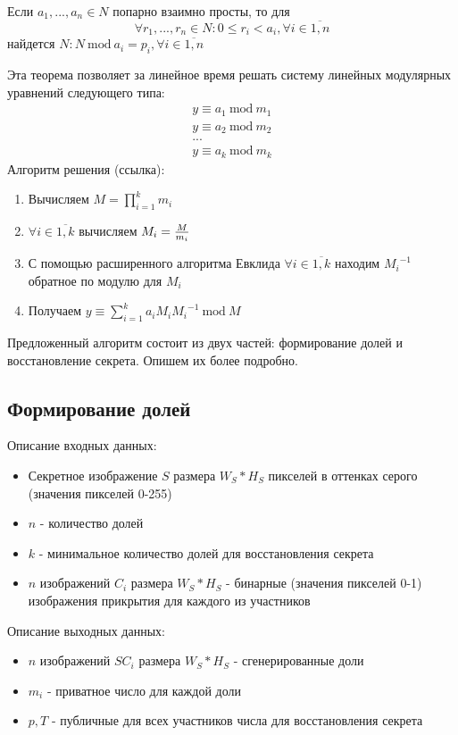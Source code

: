 \documentclass[a4paper,article,14pt]{extarticle}
\newcommand{\Mod}[1]{\ \mathrm{mod}\ #1}
\begin{document}
Если $ a_1,...,a_n \in N $ попарно взаимно просты, то для 
$$\forall r_1,...,r_n \in N : 0\leq r_i<a_i, \forall i\in \overline{1,n}$$
найдется $N: N \Mod a_i = p_i, \forall i\in \overline{1,n}$ 

Эта теорема позволяет за линейное время решать систему линейных модулярных уравнений следующего типа:
\begin{gather}
    y \equiv a_1 \Mod m_1 \\
    y \equiv a_2 \Mod m_2 \\
    ... \\
    y \equiv a_k \Mod m_k
\end{gather}
Алгоритм решения (ссылка):
\begin{enumerate}
    \item Вычисляем $M=\prod\limits_{i = 1}^k m_i$
    \item $\forall i\in \overline{1,k}$ вычисляем $M_i={{M} \over {m_i}}$
    \item С помощью расширенного алгоритма Евклида $\forall i\in \overline{1,k}$ находим ${M_i}^{-1}$ обратное по модулю для $M_i$
    \item Получаем $y \equiv \sum\limits_{i=1}^k a_i M_i {M_i}^{-1} \Mod M$
\end{enumerate}

Предложенный алгоритм состоит из двух частей: формирование долей и восстановление секрета. Опишем их более подробно.

\subsection{Формирование долей}
Описание входных данных:

\begin{itemize}
    \item Секретное изображение $S$ размера $W_S * H_S$ пикселей в оттенках серого (значения пикселей 0-255)
    \item $n$ - количество долей
    \item $k$ - минимальное количество долей для восстановления секрета
    \item $n$ изображений $C_i$ размера $W_S * H_S$ - бинарные (значения пикселей 0-1) изображения прикрытия для каждого из участников
\end{itemize}

Описание выходных данных:

\begin{itemize}
    \item $n$ изображений $SC_i$ размера $W_S * H_S$ - сгенерированные доли
    \item $m_i$ - приватное число для каждой доли
    \item $p, T$ - публичные для всех участников числа для восстановления секрета
\end{itemize}
\end{document}
